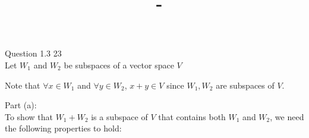 \documentclass[answers,12pt,addpoints]{exam}
\author{\name}
\title{\course \ - \assignment}
\begin{document}
\maketitle

\begin{questions}
    \question Question 1.3 23\\
    Let $W_1$ and $W_2$ be subspaces of a vector space $V$\\
    Note that $\forall x \in W_1$ and $\forall y \in W_2$, $x + y \in V$ since $W_1, W_2$ are subspaces of $V$.\\
    \begin{solution}
        Part (a):\\
        To show that $W_1 + W_2$ is a subspace of $V$ that contains both $W_1$ and $W_2$, we need the following properties to hold:\\
\end{solution}
\end{questions}
\end{document}
